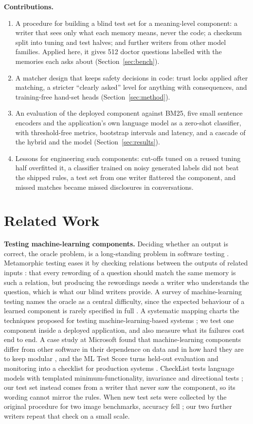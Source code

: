 \documentclass[sn-mathphys-num]{sn-jnl}
\begin{document}
\textbf{Contributions.}
\begin{enumerate}
\item A procedure for building a blind test set for a meaning-level component: a writer that sees only what each memory means, never the
code; a checksum split into tuning and test halves; and further writers from other model families. Applied here, it gives 512 doctor questions
labelled with the memories each asks about (Section~\ref{sec:bench}).
\item A matcher design that keeps safety decisions in code: trust locks applied after matching, a stricter ``clearly asked'' level for
anything with consequences, and training-free hand-set heads (Section~\ref{sec:method}).
\item An evaluation of the deployed component against BM25, five small sentence encoders and the application's own language model as a
zero-shot classifier, with threshold-free metrics, bootstrap intervals and latency, and a cascade of the hybrid and the model
(Section~\ref{sec:results}).
\item Lessons for engineering such components: cut-offs tuned on a reused tuning half overfitted it, a classifier trained on noisy generated
labels did not beat the shipped rules, a test set from one writer flattered the component, and missed matches became missed disclosures in conversations.
\end{enumerate}

\section{Related Work}\label{sec:related}
\textbf{Testing machine-learning components.} Deciding whether an output is correct, the oracle problem, is a long-standing problem in
software testing \cite{barr2015oracle}. Metamorphic testing eases it by checking relations between the outputs of related inputs
\cite{chen2018metamorphic}: that every rewording of a question should match the same memory is such a relation, but producing the rewordings
needs a writer who understands the question, which is what our blind writers provide. A survey of machine-learning testing names the oracle as a central difficulty, since the expected
behaviour of a learned component is rarely specified in full \cite{zhang2022mltesting}. A systematic mapping charts the techniques proposed for
testing machine-learning-based systems \cite{riccio2020mlsystems}; we test one component inside a deployed application, and also measure what
its failures cost end to end. A case study at Microsoft found that
machine-learning components differ from other software in their dependence on data and in how hard they are to keep modular
\cite{amershi2019se4ml}, and the ML Test Score turns held-out evaluation and monitoring into a checklist for production systems
\cite{breck2017mltestscore}. CheckList tests language models with templated minimum-functionality, invariance and directional tests
\cite{ribeiro2020checklist}; our test set instead comes from a writer that never saw the component, so its wording cannot mirror the rules.
When new test sets were collected by the original procedure for two image benchmarks, accuracy fell \cite{recht2019imagenet}; our two further
writers repeat that check on a small scale.
\end{document}
